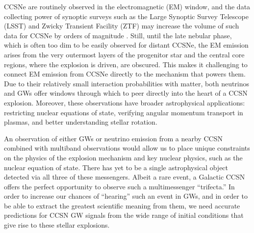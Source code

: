 \documentclass[twocolumn,times]{aastex62}  %
\begin{document}
CCSNe are routinely observed in the electromagnetic (EM) window, and the data collecting power of synoptic surveys such as the Large Synoptic Survey Telescope (LSST) and Zwicky Transient Facility (ZTF) may increase the volume of such data for CCSNe by orders of magnitude \citep{ivezic:2008,bellm:2019}.
Still, until the late nebular phase, which is often too dim to be easily observed for distant CCSNe, the EM emission arises from the very outermost layers of the progenitor star and the central core regions, where the explosion is driven, are obscured. 
This makes it challenging to connect EM emission from CCSNe directly to the mechanism that powers them.
Due to their relatively small interaction probabilities with matter, both neutrinos and GWs offer windows through which to peer directly into the heart of a CCSN explosion.  
Moreover, these observations have broader astrophysical applications: restricting nuclear equations of state, verifying angular momentum transport in plasmas, and better understanding stellar rotation.

An observation of either GWs or neutrino emission from a nearby CCSN combined with multiband observations would allow us to place unique constraints on the physics of the explosion mechanism and key nuclear physics, such as the nuclear equation of state.  
There has yet to be a single astrophysical object detected via all three of these messengers.  
Albeit a rare event, a Galactic CCSN offers the perfect opportunity to observe such a multimessenger ``trifecta.''  
In order to increase our chances of ``hearing'' such an event in GWs, and in order to be able to extract the greatest scientific meaning from them, we need accurate predictions for CCSN GW signals from the wide range of initial conditions that give rise to these stellar explosions.
\end{document}
